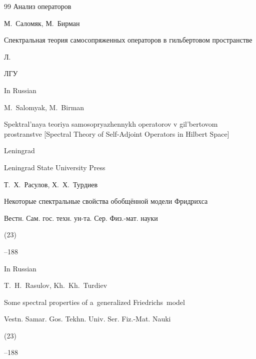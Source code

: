 \begin{thebibliography}{99}
\voltitle Анализ операторов







\by М.~Саломяк, М.~Бирман 

\book Спектральная теория самосопряженных операторов в гильбертовом пространстве

\publaddr Л.

\publ ЛГУ



\misctransl

\lang In Russian

\by M.~Salomyak, M.~Birman

\book  Spektral'naya teoriya samosopryazhennykh operatorov v gil'bertovom prostranstve \rm [Spectral Theory of Self-Adjoint Operators in Hilbert Space]

\publaddr Leningrad

\publ Leningrad State University Press








\by Т.~Х.~Расулов, Х.~Х.~Турдиев

\paper Некоторые спектральные свойства обобщённой модели Фридрихса

\jour Вестн. Сам. гос. техн. ун-та. Сер. Физ.-мат. науки


(23)

--188



\misctransl

\lang In Russian

\by T.~H.~Rasulov, Kh.~Kh.~Turdiev

\paper Some spectral properties of a~generalized Friedrichs~model

\jour Vestn. Samar. Gos. Tekhn. Univ. Ser. Fiz.-Mat. Nauki


(23)

--188



\end{thebibliography}



\renewcommand{\correctvfill}{\vspace{-9mm}}



\makeentitle







 \newpage

%


%

%

%

%

